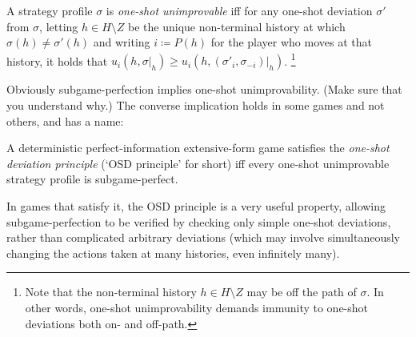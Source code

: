 \begin{definition}
	\label{definition:oneshot_unimp}
	A strategy profile $\sigma$ is \emph{one-shot unimprovable} iff for any one-shot deviation $\sigma'$ from $\sigma$, letting $h \in H \setminus Z$ be the unique non-terminal history at which $\sigma(h) \neq \sigma'(h)$ and writing $i \coloneqq P(h)$ for the player who moves at that history, it holds that $u_i(h,\sigma|_h) \geq u_i(h,(\sigma'_i,\sigma_{-i})|_h)$.%
	\footnote{Note that the non-terminal history $h \in H \setminus Z$ may be off the path of $\sigma$. In other words, one-shot unimprovability demands immunity to one-shot deviations both on- and off-path.}
\end{definition}

Obviously subgame-perfection implies one-shot unimprovability. (Make sure that you understand why.) The converse implication holds in some games and not others, and has a name:

\begin{definition}
	\label{definition:osdp}
	A deterministic perfect-information extensive-form game satisfies the \emph{one-shot deviation principle} (`OSD principle' for short) iff every one-shot unimprovable strategy profile is subgame-perfect. 
\end{definition}

In games that satisfy it, the OSD principle is a very useful property, allowing subgame-perfection to be verified by checking only simple one-shot deviations, rather than complicated arbitrary deviations (which may involve simultaneously changing the actions taken at many histories, even infinitely many).

